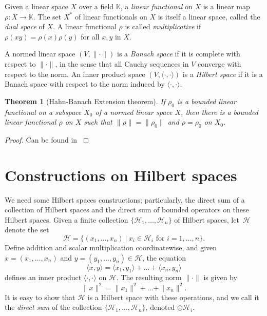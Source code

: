 \documentclass[12pt,a4paper]{report}
\theoremstyle{plain}
\newtheorem*{thm*}{Theorem}
\theoremstyle{definition}
\newcommand{\1}{\mathbbm{1}}
\renewcommand{\H}{\mathcal{H}}
\begin{document}
Given a linear space $X$ over a field $\mathbb K$, a \emph{linear functional} on $X$ is a linear map 
$\rho:X\to\mathbb K$. The set $X^\ast$ of linear functionals on $X$ is itself a linear space, called
the \emph{dual space} of $X$. A linear functional $\rho$ is called \emph{multiplicative} if $\rho(xy) = \rho(x)\rho(y)$ for all $x,y$ in $X$.

A normed linear space $(V,\|\cdot\|)$ is a \emph{Banach space} if it is complete with respect to 
$\|\cdot\|$, in the sense that all Cauchy sequences in $V$ converge with respect to the norm. An inner 
product space $(V,\langle\cdot,\cdot\rangle)$ is a \emph{Hilbert space} if it is a Banach space with 
respect to the norm induced by $\langle\cdot,\cdot\rangle$.

\begin{thm*}[Hahn-Banach Extension theorem] 
	If $\rho_0$ is a bounded linear functional on a subspace $X_0$ of a normed linear space $X$,
	then there is a bounded linear functional $\rho$ on $X$ such that $\|\rho\|=\|\rho_0\|$ and 
	$\rho=\rho_0$ on $X_0$.
\end{thm*}
\begin{proof}
	Can be found in \cite[Theorem 1.6.1, p.~44]{kadison83}
\end{proof}

\section{Constructions on Hilbert spaces}\label{section:hscons}
We need some Hilbert spaces constructions; particularly, the direct sum of a collection of Hilbert 
spaces and the direct sum of bounded operators on these Hilbert spaces.
Given a finite collection $\{\H_1,\dots,\H_n\}$ of Hilbert spaces, let~$\H$ denote the set
\[
	\H  = \{(x_1,\dots,x_n) ~|~ x_i \in \H_i \mbox { for } i=1,\dots,n\}.
\]
Define addition and scalar multiplication coordinatewise, and given $x=(x_1,\dots,x_n)$ and 
$y=(y_1,\dots,y_n) \in \H$, the equation
\[
	\langle x,y\rangle = \langle x_1,y_1\rangle + \dots + \langle x_n,y_n \rangle
\]
defines an inner product $\langle\cdot,\cdot\rangle$ on $\H$. The resulting norm $\|\cdot\|$ is 
given by
\[
	\|x\|^2 = \|x_1\|^2 + \dots + \|x_n\|^2.
\]
It is easy to show that $\H$ is a Hilbert space with these operations, and we call it the
\emph{direct sum} of the collection $\{\H_1,\dots,\H_n\}$, denoted $\oplus\H_i$.
\end{document}
